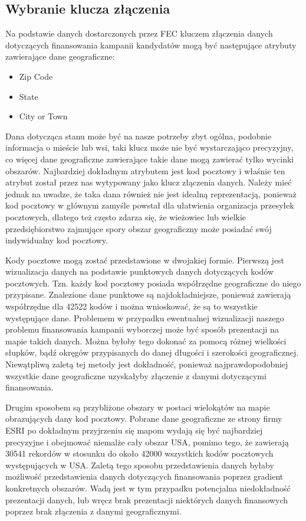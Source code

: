 \documentclass[10pt,a4paper]{article}
\begin{document}
\subsection{Wybranie klucza złączenia}
Na podstawie danych dostarczonych przez FEC kluczem złączenia danych dotyczących finansowania kampanii kandydatów mogą być następujące atrybuty zawierające dane geograficzne:

\begin{itemize}
\item Zip Code
\item State
\item City or Town
\end{itemize}

Dana dotycząca stanu może być na nasze potrzeby zbyt ogólna, podobnie informacja o mieście lub wsi, taki klucz może nie być wystarczająco precyzyjny, co więcej dane geograficzne zawierające takie dane mogą zawierać tylko wycinki obszarów. Najbardziej dokładnym atrybutem jest kod pocztowy i właśnie ten atrybut został przez nas wytypowany jako klucz złączenia danych. Należy mieć jednak na uwadze, że taka dana również nie jest idealną reprezentacją, ponieważ kod pocztowy w głównym zamyśle powstał dla ułatwienia organizacja przesyłek pocztowych, dlatego też często zdarza się, że wieżowiec lub wielkie przedsiębiorstwo zajmujące spory obszar geograficzny może posiadać swój indywidualny kod pocztowy. 

Kody pocztowe mogą zostać przedstawione w dwojakiej formie. Pierwszą jest wizualizacja danych na podstawie punktowych danych dotyczących kodów pocztowych. Tzn. każdy kod pocztowy posiada współrzędne geograficzne do niego przypisane. Znalezione dane punktowe są najdokładniejsze, ponieważ zawierają współrzędne dla 42522 kodów i można wnioskować, że są to wszystkie występujące dane. Problemem w przypadku ewentualnej wizualizacji naszego problemu finansowania kampanii wyborczej może być sposób prezentacji na mapie takich danych. Można byłoby tego dokonać za pomocą różnej wielkości słupków, bądź okręgów przypisanych do danej długości i szerokości geograficznej. Niewątpliwą zaletą tej metody jest dokładność, ponieważ najprawdopodobniej wszystkie dane geograficzne uzyskałyby złączenie z danymi dotyczącymi finansowania.

Drugim sposobem są przybliżone obszary w postaci wielokątów na mapie obrazujących dany kod pocztowy. Pobrane dane geograficzne ze strony firmy ESRI po dokładnym przyjrzeniu się mapom wydają się być najbardziej precyzyjne i obejmować niemalże cały obszar USA, pomimo tego, że zawierają 30541 rekordów w stosunku do około 42000 wszystkich kodów pocztowych występujących w USA. Zaletą tego sposobu przedstawienia danych byłaby możliwość przedstawienia danych dotyczących finansowania poprzez gradient konkretnych obszarów. Wadą jest w tym przypadku potencjalna niedokładność prezentacji danych, lub wręcz brak prezentacji niektórych danych finansowych poprzez brak złączenia z danymi geograficznymi.
\end{document}
